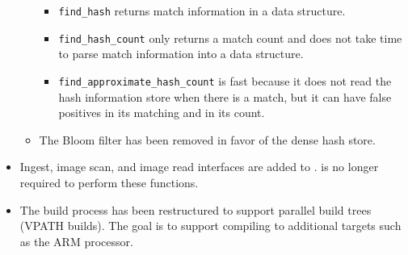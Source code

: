 \documentclass[11pt,fleqn]{article} %
\begin{document}
\begin{itemize}
\begin{itemize}
\begin{itemize}
    \item \verb+find_hash+ returns match information in a data structure.
    \item \verb+find_hash_count+ only returns a match count and does not take time to parse match information into a data structure.
    \item \verb+find_approximate_hash_count+ is fast because it does not read the hash information store when there is a match, but it can have false positives in its matching and in its count.
    \end{itemize}
  \item The Bloom filter has been removed in favor of the dense hash store.
  \end{itemize}
\item Ingest, image scan, and image read interfaces are added to \hdb. \bulk is no longer required to perform these functions.
\item The build process has been restructured to support parallel build trees (VPATH builds).  The goal is to support compiling to additional targets such as the ARM processor.
\end{itemize}
\end{document}
